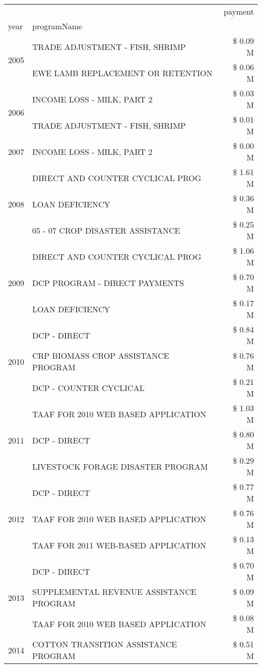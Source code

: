 \begin{tabular}{llr}
\toprule
 &  & payment \\
year & programName &  \\
\midrule
\multirow[t]{2}{*}{2005} & TRADE ADJUSTMENT - FISH, SHRIMP & \$ 0.09 M \\
 & EWE LAMB REPLACEMENT OR RETENTION & \$ 0.06 M \\
\cline{1-3}
\multirow[t]{2}{*}{2006} & INCOME LOSS - MILK, PART 2 & \$ 0.03 M \\
 & TRADE ADJUSTMENT - FISH, SHRIMP & \$ 0.01 M \\
\cline{1-3}
2007 & INCOME LOSS - MILK, PART 2 & \$ 0.00 M \\
\cline{1-3}
\multirow[t]{3}{*}{2008} & DIRECT AND COUNTER CYCLICAL PROG & \$ 1.61 M \\
 & LOAN DEFICIENCY & \$ 0.36 M \\
 & 05 - 07 CROP DISASTER ASSISTANCE & \$ 0.25 M \\
\cline{1-3}
\multirow[t]{3}{*}{2009} & DIRECT AND COUNTER CYCLICAL PROG & \$ 1.06 M \\
 & DCP PROGRAM - DIRECT PAYMENTS & \$ 0.70 M \\
 & LOAN DEFICIENCY & \$ 0.17 M \\
\cline{1-3}
\multirow[t]{3}{*}{2010} & DCP - DIRECT & \$ 0.84 M \\
 & CRP BIOMASS CROP ASSISTANCE PROGRAM & \$ 0.76 M \\
 & DCP - COUNTER CYCLICAL & \$ 0.21 M \\
\cline{1-3}
\multirow[t]{3}{*}{2011} & TAAF FOR 2010 WEB BASED APPLICATION & \$ 1.03 M \\
 & DCP - DIRECT & \$ 0.80 M \\
 & LIVESTOCK FORAGE DISASTER PROGRAM & \$ 0.29 M \\
\cline{1-3}
\multirow[t]{3}{*}{2012} & DCP - DIRECT & \$ 0.77 M \\
 & TAAF FOR 2010 WEB BASED APPLICATION & \$ 0.76 M \\
 & TAAF FOR 2011 WEB-BASED APPLICATION & \$ 0.13 M \\
\cline{1-3}
\multirow[t]{3}{*}{2013} & DCP - DIRECT & \$ 0.70 M \\
 & SUPPLEMENTAL REVENUE ASSISTANCE PROGRAM & \$ 0.09 M \\
 & TAAF FOR 2010 WEB BASED APPLICATION & \$ 0.08 M \\
\cline{1-3}
\multirow[t]{3}{*}{2014} & COTTON TRANSITION ASSISTANCE PROGRAM & \$ 0.51 M \\

\end{tabular}
